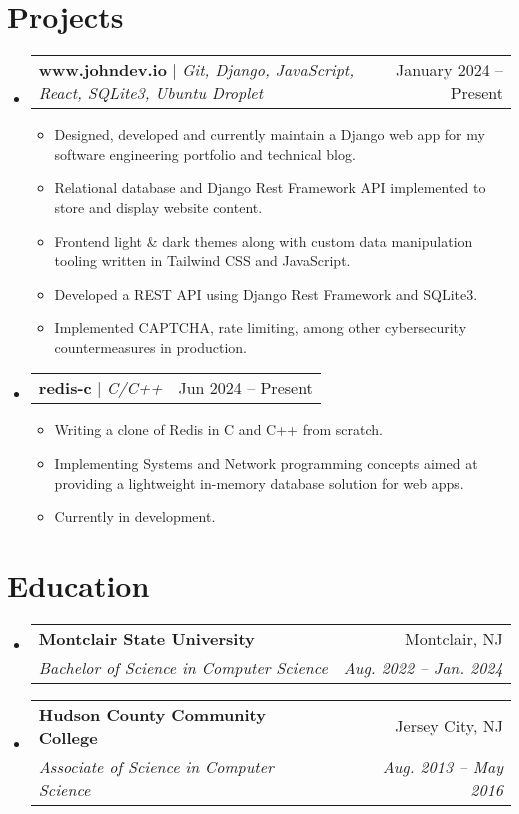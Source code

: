 \documentclass[letterpaper,11pt]{article}
\makeatletter
\newcommand{\resumeItem}[1]{
  \item\small{
    {#1 \vspace{-2pt}}
  }
}
\newcommand{\resumeSubheading}[4]{
  \vspace{-2pt}\item
    \begin{tabular*}{0.97\textwidth}[t]{l@{\extracolsep{\fill}}r}
      \textbf{#1} & #2 \\
      \textit{\small#3} & \textit{\small #4} \\
    \end{tabular*}\vspace{-7pt}
}
\newcommand{\resumeProjectHeading}[2]{
    \item
    \begin{tabular*}{0.97\textwidth}{l@{\extracolsep{\fill}}r}
      \small#1 & #2 \\
    \end{tabular*}\vspace{-7pt}
}
\newcommand{\resumeSubHeadingListStart}{\begin{itemize}[leftmargin=0.15in, label={}]}
\newcommand{\resumeSubHeadingListEnd}{\end{itemize}}
\newcommand{\resumeItemListStart}{\begin{itemize}}
\newcommand{\resumeItemListEnd}{\end{itemize}\vspace{-5pt}}
\makeatother
\begin{document}
\section{Projects}
    \resumeSubHeadingListStart
      \resumeProjectHeading
            {\textbf{www.johndev.io} $|$ \emph{Git, Django, JavaScript, React, SQLite3, Ubuntu Droplet}}{January 2024 -- Present}
            \resumeItemListStart
            \resumeItem{Designed, developed and currently maintain a Django web app for my software engineering portfolio and technical blog.}
            \resumeItem{Relational database and Django Rest Framework API implemented to store and display website content.}
            \resumeItem{Frontend light \& dark themes along with custom data manipulation tooling written in Tailwind CSS and JavaScript.}
            \resumeItem{Developed a REST API using Django Rest Framework and SQLite3.}
            \resumeItem{Implemented CAPTCHA, rate limiting, among other cybersecurity countermeasures in production.}
          \resumeItemListEnd
        \resumeProjectHeading
          {\textbf{redis-c} $|$ \emph{C/C++}}{Jun 2024 -- Present}
          \resumeItemListStart
            \resumeItem{Writing a clone of Redis in C and C++ from scratch.}
            \resumeItem{Implementing Systems and Network programming concepts aimed at providing a lightweight in-memory database solution for web apps.}
            \resumeItem{Currently in development.}
          \resumeItemListEnd
    \resumeSubHeadingListEnd

\section{Education}
  \resumeSubHeadingListStart
    \resumeSubheading
      {Montclair State University}{Montclair, NJ}
      {Bachelor of Science in Computer Science}{Aug. 2022 -- Jan. 2024}
    \resumeSubheading
      {Hudson County Community College}{Jersey City, NJ}
      {Associate of Science in Computer Science }{Aug. 2013 -- May 2016}
  \resumeSubHeadingListEnd

    
\end{document}
